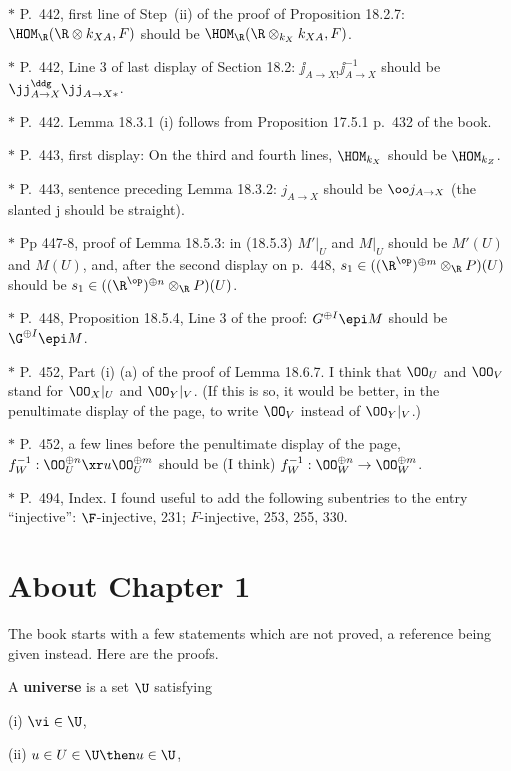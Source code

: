 \documentclass[12pt]{article}
\theoremstyle{remark}
\theoremstyle{definition}
\begin{document}
\nn$*$ P.~442, first line of Step~(ii) of the proof of Proposition 18.2.7: $\HOM_\R(\R\otimes k_{XA},F)$ should be $\HOM_\R(\R\otimes_{k_X}k_{XA},F)$. 

\nn$*$ P.~442, Line 3 of last display of Section 18.2: $\jj_{A\to X!}\jj_{A\to X}^{-1}$ should be $\jj_{A\to X}^\ddg\jj_{A\to X*}$. 

\nn$*$ P.~442. Lemma 18.3.1 (i) follows from Proposition 17.5.1 p.~432 of the book. 

\nn$*$ P.~443, first display: On the third and fourth lines, $\HOM_{k_X}$ should be $\HOM_{k_Z}$. 

\nn$*$ P.~443, sentence preceding Lemma 18.3.2: $j_{A\to X}$ should be $\oo j_{A\to X}$ (the slanted j should be straight). 

\nn$*$ Pp 447-8, proof of Lemma 18.5.3: in (18.5.3) $M'|_U$ and $M|_U$ should be $M'(U)$ and $M(U)$, and, after the second display on p.~448, $s_1\in((\R^{\op})^{\oplus m}\otimes_\R P)(U)$ should be $s_1\in((\R^{\op})^{\oplus n}\otimes_\R P)(U)$.

\nn$*$ P.~448, Proposition 18.5.4, Line 3 of the proof: $G^{\oplus I}\epi M$ should be $\G^{\oplus I}\epi M$.

\nn$*$ P.~452, Part (i) (a) of the proof of Lemma 18.6.7. I think that $\OO_U$ and $\OO_V$ stand for $\OO_X|_U$ and $\OO_Y|_V$. (If this is so, it would be better, in the penultimate display of the page, to write $\OO_V$ instead of $\OO_Y|_V$.) 

\nn$*$ P.~452, a few lines before the penultimate display of the page, $f_W^{-1}:\OO_U^{\oplus n}\xr u\OO_U^{\oplus m}$ should be (I think) $f_W^{-1}:\OO_W^{\oplus n}\to\OO_W^{\oplus m}$.

\nn$*$ P.~494, Index. I found useful to add the following subentries to the entry ``injective'': $\F$-injective, 231; $F$-injective, 253, 255, 330.


\section{About Chapter 1}


The book starts with a few statements which are not proved, a reference being given instead. Here are the proofs.

A \textbf{universe} is a set $\U$ satisfying 

(i) $\vi\in\U$,

(ii) $u\in U\in\U\then u\in\U$,
\end{document}
